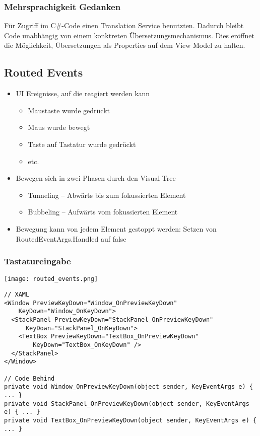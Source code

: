 \subsubsection{Mehrsprachigkeit Gedanken}
Für Zugriff im C\#-Code einen Translation Service benutzten. Dadurch bleibt Code unabhängig von einem konktreten Übersetzungsmechanismus. Dies eröffnet die Möglichkeit, Übersetzungen als Properties auf dem View Model zu halten.

\subsection{Routed Events}
\begin{itemize}[topsep=0pt, leftmargin=4mm]
    \setlength\itemsep{-0.3em}
    \item UI Ereignisse, auf die reagiert werden kann
    \begin{itemize}[topsep=0pt, leftmargin=4mm]
        \setlength\itemsep{-0.3em}
        \item Maustaste wurde gedrückt
        \item Maus wurde bewegt
        \item Taste auf Tastatur wurde gedrückt
        \item etc.
    \end{itemize}
    \item Bewegen sich in zwei Phasen durch den Visual Tree
    \begin{itemize}[topsep=0pt, leftmargin=4mm]
        \setlength\itemsep{-0.3em}
        \item Tunneling – Abwärts bis zum fokussierten Element
        \item Bubbeling – Aufwärts vom fokussierten Element
    \end{itemize}
    \item Bewegung kann von jedem Element gestoppt werden: Setzen von RoutedEventArgs.Handled auf false
\end{itemize}
\subsubsection{Tastatureingabe}
\texttt{[image: routed\_events.png]}
\begin{lstlisting}
// XAML
<Window PreviewKeyDown="Window_OnPreviewKeyDown"
    KeyDown="Window_OnKeyDown">
  <StackPanel PreviewKeyDown="StackPanel_OnPreviewKeyDown"
      KeyDown="StackPanel_OnKeyDown">
    <TextBox PreviewKeyDown="TextBox_OnPreviewKeyDown"
        KeyDown="TextBox_OnKeyDown" />
  </StackPanel>
</Window>

// Code Behind
private void Window_OnPreviewKeyDown(object sender, KeyEventArgs e) { ... }
private void StackPanel_OnPreviewKeyDown(object sender, KeyEventArgs e) { ... }
private void TextBox_OnPreviewKeyDown(object sender, KeyEventArgs e) { ... }
\end{lstlisting}
